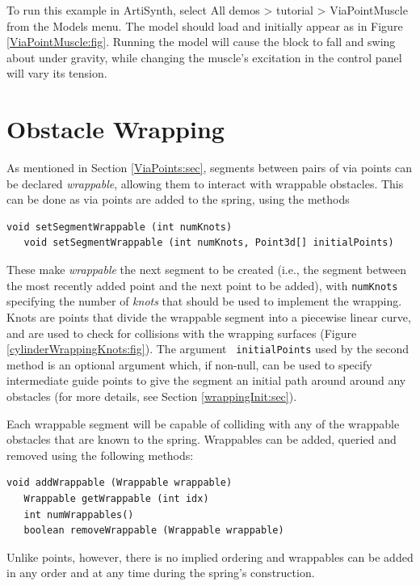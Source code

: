 To run this example in ArtiSynth, select {\sf All demos > tutorial >
ViaPointMuscle} from the {\sf Models} menu. The model should load and
initially appear as in Figure \ref{ViaPointMuscle:fig}.  Running the
model will cause the block to fall and swing about under gravity,
while changing the muscle's {\sf excitation} in the control panel will
vary its tension.

\section{Obstacle Wrapping}
\label{ObstacleWrapping:sec}

As mentioned in Section \ref{ViaPoints:sec}, segments between pairs of
via points can be declared {\it wrappable}, allowing them to interact
with wrappable obstacles. This can be done as via points are added
to the spring, using the methods
%
\begin{lstlisting}[]
   void setSegmentWrappable (int numKnots)
   void setSegmentWrappable (int numKnots, Point3d[] initialPoints)
\end{lstlisting}
%
These make {\it wrappable} the next segment to be created (i.e., the segment
between the most recently added point and the next point to be added),
with {\tt numKnots} specifying the number of {\it knots} that should
be used to implement the wrapping. Knots are points that divide the
wrappable segment into a piecewise linear curve, and are used to
check for collisions with the wrapping surfaces
(Figure \ref{cylinderWrappingKnots:fig}).  The argument {\tt
initialPoints} used by the second method is an optional argument
which, if non-null, can be used to specify intermediate guide points
to give the segment an initial path around around any obstacles (for
more details, see Section \ref{wrappingInit:sec}).

Each wrappable segment will be capable of colliding with any of the
wrappable obstacles that are known to the spring.  Wrappables can be
added, queried and removed using the following methods:
%
\begin{lstlisting}[]
   void addWrappable (Wrappable wrappable)
   Wrappable getWrappable (int idx)
   int numWrappables()
   boolean removeWrappable (Wrappable wrappable)
\end{lstlisting}
%
Unlike points, however, there is no implied ordering and wrappables
can be added in any order and at any time during the spring's
construction.

